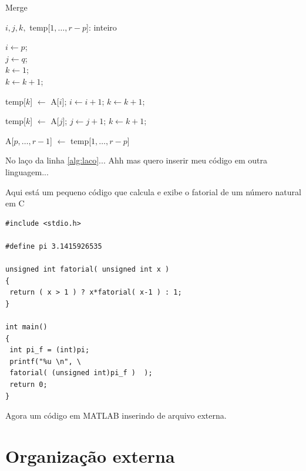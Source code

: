 \documentclass[10pt,a4paper,twocolumn]{book}
\begin{document}
		\begin{algorithm}[h]
			\caption{{\sc Merge }}
			\DontPrintSemicolon %
			$i, j, k,$ temp[$1, \ldots, r-p$]: inteiro 
			
			$i \gets p$;\\
			$j \gets q$;\\
			$k \gets 1$;\\
			
			{
				\label{alg:laco}
				$k \gets k + 1$;
			}
			
			{
				temp[$k$] $\gets$ A[$i$];\;
				$i \gets i + 1$;\;
				$k \gets k + 1$;
			}
			
			{
				temp[$k$] $\gets$ A[$j$];\; 
				$j \gets j + 1$;\;
				$k \gets k + 1$;
			}			
			
			A[$p , \ldots, r-1$] $\gets$ temp[$1, \ldots, r-p$]\;
			\;
			\label{algo:selectionsort}
		\end{algorithm}	
		
		No laço da linha \ref{alg:laco}...
		Ahh mas quero inserir meu código em outra linguagem...
		
\lstset{language=C}			
Aqui está um pequeno código que calcula e exibe o fatorial de um número natural em C

\begin{lstlisting}
#include <stdio.h>

#define pi 3.1415926535

unsigned int fatorial( unsigned int x )
{
 return ( x > 1 ) ? x*fatorial( x-1 ) : 1;
}

int main()
{
 int pi_f = (int)pi; 
 printf("%u \n", \
 fatorial( (unsigned int)pi_f )  );
 return 0;
}
\end{lstlisting}

Agora um código em MATLAB inserindo de arquivo externa.



\section{Organização externa}
	
	
	
		\nocite{livro:joao}
		\nocite{conf:alckmin}
\end{document}
